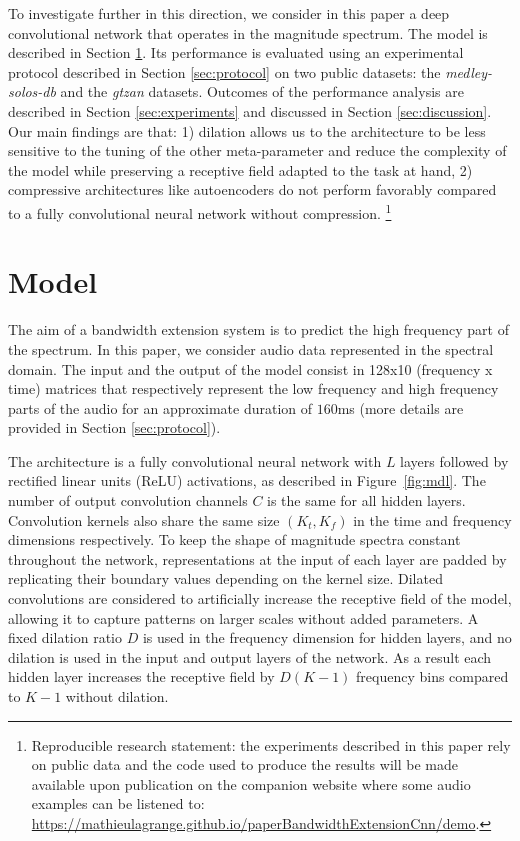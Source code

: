 \documentclass{article}
\begin{document}
To investigate further in this direction, we consider in this paper a deep convolutional network that operates in the magnitude spectrum. The model is described in Section \ref{sec:model}. Its performance is evaluated using an experimental protocol described in Section \ref{sec:protocol} on two public datasets: the \textit{medley-solos-db} and the \textit{gtzan} datasets. Outcomes of the performance analysis are described in Section \ref{sec:experiments} and discussed in Section \ref{sec:discussion}. Our main findings are that: 1) dilation allows us to the architecture to be less sensitive to the tuning of the other meta-parameter and reduce the complexity of the model while preserving a receptive field adapted to the task at hand, 2) compressive architectures like autoencoders do not perform favorably compared to a fully convolutional neural network without compression. \footnote{Reproducible research statement: the experiments described in this paper rely on public data and the code used to produce the results will be made available upon publication on the companion website where some audio examples can be listened to: \url{https://mathieulagrange.github.io/paperBandwidthExtensionCnn/demo}.}

\section{Model}
\label{sec:model}

The aim of a bandwidth extension system is to predict the high frequency part of the spectrum. In this paper, we consider audio data represented in the spectral domain. The input and the output of the model consist in 128x10 (frequency x time) matrices that respectively represent the low frequency and high frequency parts of the audio for an approximate duration of $160$ms (more details are provided in Section \ref{sec:protocol}).

The architecture is a fully convolutional neural network \cite{long2015fully} with $L$ layers followed by rectified linear units (ReLU) activations, as described in Figure~\ref{fig:mdl}. The number of output convolution channels $C$ is the same for all hidden layers. Convolution kernels also share the same size $(K_t, K_f)$ in the time and frequency dimensions respectively. To keep the shape of magnitude spectra constant throughout the network, representations at the input of each layer are padded by replicating their boundary values depending on the kernel size. Dilated convolutions \cite{yu2016multi, oord2016wavenet} are considered to artificially increase the receptive field of the model, allowing it to capture patterns on larger scales without added parameters. A fixed dilation ratio $D$ is used in the frequency dimension for hidden layers, and no dilation is used in the input and output layers of the network. As a result each hidden layer increases the receptive field by $D(K-1)$ frequency bins compared to $K-1$ without dilation.
\end{document}
